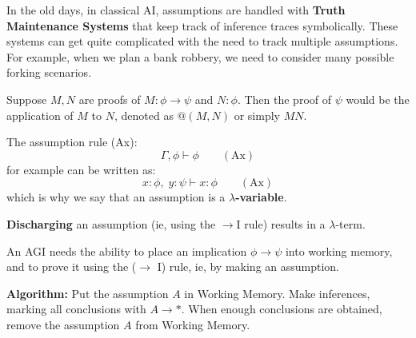 In the old days, in classical AI, assumptions are handled with \textbf{Truth Maintenance Systems} that keep track of inference traces symbolically.  These systems can get quite complicated with the need to track multiple assumptions.  For example, when we plan a bank robbery, we need to consider many possible forking scenarios.  

Suppose $M, N$ are proofs of $M: \phi \rightarrow \psi$ and $N: \phi$.  Then the proof of $\psi$ would be the application of $M$ to $N$, denoted as $@(M, N)$ or simply $M N$.

The assumption rule (Ax):
\begin{equation}
\Gamma, \phi \vdash \phi \qquad (\mbox{Ax})
\end{equation}
for example can be written as:
\begin{equation}
x : \phi, \; y : \psi \vdash x : \phi \qquad (\mbox{Ax})
\end{equation}
which is why we say that an assumption is a \textbf{$\lambda$-variable}.  

\textbf{Discharging} an assumption (ie, using the $\rightarrow$I rule) results in a $\lambda$-term.

An AGI needs the ability to place an implication $\phi \rightarrow \psi$ into working memory, and to prove it using the ($\rightarrow$ I) rule, ie, by making an assumption.

\textbf{Algorithm:}  Put the assumption $A$ in Working Memory.  Make inferences, marking all conclusions with $A \rightarrow *$.  When enough conclusions are obtained, remove the assumption $A$ from Working Memory.


